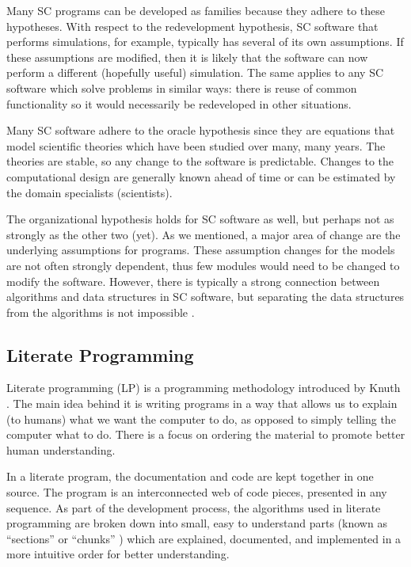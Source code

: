 \documentclass[10pt, preprint]{sigplanconf}
\begin{document}
Many SC programs can be developed as families because they adhere to these
hypotheses. With respect to the redevelopment hypothesis, SC software that
performs simulations, for example, typically has several of its own
assumptions. If these assumptions are modified, then it is likely that the
software can now perform a different (hopefully useful) simulation. The same
applies to any SC software which solve problems in similar ways: there is reuse
of common functionality so it would necessarily be redeveloped in other
situations.

Many SC software adhere to the oracle hypothesis since they are equations that
model scientific theories which have been studied over many, many years. The
theories are stable, so any change to the software is predictable. Changes to
the computational design are generally known ahead of time or can be estimated
by the domain specialists (scientists).

The organizational hypothesis holds for SC software as well, but perhaps not as
strongly as the other two (yet). As we mentioned, a major area of change are the
underlying assumptions for programs. These assumption changes for the models are
not often strongly dependent, thus few modules would need to be changed to
modify the software. However, there is typically a strong connection between
algorithms and data structures in SC software, but separating the data
structures from the algorithms is not impossible \cite{Berti2000, ElSheikh2004}.


\subsection{Literate Programming} \label{subsec:literate}

Literate programming (LP) is a programming methodology introduced by Knuth
\cite{Knuth1984}. The main idea behind it is writing programs in a way that
allows us to explain (to humans) what we want the computer to do, as opposed to
simply telling the computer what to do. There is a focus on ordering the
material to promote better human understanding.

In a literate program, the documentation and code are kept together in one
source. The program is an interconnected web of code pieces, presented in any
sequence. As part of the development process, the algorithms used in literate
programming are broken down into small, easy to understand parts (known as
``sections'' \cite{Knuth1984} or ``chunks'' \cite{Johnson1997}) which are
explained, documented, and implemented in a more intuitive order for better
understanding.
\end{document}
